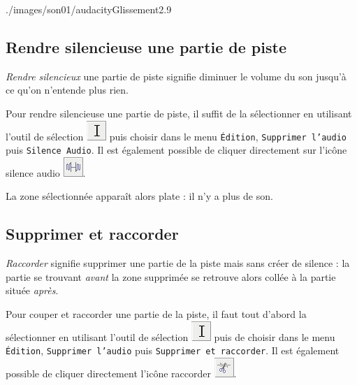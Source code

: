 %
                {./images/son01/audacityGlissement2}{.9\textwidth}




\subsection{Rendre silencieuse une partie de piste}\label{Son1silence}

\emph{Rendre silencieux} une partie de piste signifie diminuer le volume du son jusqu'à ce qu'on n'entende plus rien.

Pour rendre silencieuse une partie de piste, il suffit de la sélectionner en utilisant l'outil de sélection \includegraphics[width=.5cm]{./images/son01/audacityIconeSelection} puis choisir dans le menu \texttt{Édition}, \texttt{Supprimer l'audio} puis \texttt{Silence Audio}. Il est également possible de cliquer directement sur l'icône silence audio \includegraphics[width=.5cm]{./images/son01/audacityIconeSilence}.


La zone sélectionnée apparaît alors plate : il n'y a plus de son.





\subsection{Supprimer et raccorder}\label{Son1couperRaccorder} 

\emph{Raccorder} signifie supprimer une partie de la piste mais sans créer de silence : la partie se trouvant \emph{avant} la zone supprimée se retrouve alors collée à la partie située \emph{après}.

Pour couper et raccorder une partie de la piste, il faut tout d'abord la sélectionner en utilisant l'outil de sélection \includegraphics[width=.5cm]{./images/son01/audacityIconeSelection} puis de choisir dans le menu \texttt{Édition}, \texttt{Supprimer l'audio} puis \texttt{Supprimer et raccorder}. Il est également possible de cliquer directement l'icône raccorder \includegraphics[width=.5cm]{./images/son01/audacityIconeRaccorder}.

